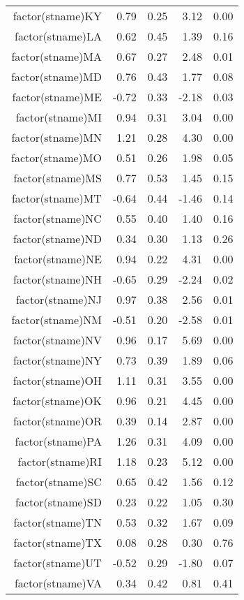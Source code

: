 \begin{table}[ht]
\begin{tabular}{rrrrr}
  factor(stname)KY & 0.79 & 0.25 & 3.12 & 0.00 \\ 
  factor(stname)LA & 0.62 & 0.45 & 1.39 & 0.16 \\ 
  factor(stname)MA & 0.67 & 0.27 & 2.48 & 0.01 \\ 
  factor(stname)MD & 0.76 & 0.43 & 1.77 & 0.08 \\ 
  factor(stname)ME & -0.72 & 0.33 & -2.18 & 0.03 \\ 
  factor(stname)MI & 0.94 & 0.31 & 3.04 & 0.00 \\ 
  factor(stname)MN & 1.21 & 0.28 & 4.30 & 0.00 \\ 
  factor(stname)MO & 0.51 & 0.26 & 1.98 & 0.05 \\ 
  factor(stname)MS & 0.77 & 0.53 & 1.45 & 0.15 \\ 
  factor(stname)MT & -0.64 & 0.44 & -1.46 & 0.14 \\ 
  factor(stname)NC & 0.55 & 0.40 & 1.40 & 0.16 \\ 
  factor(stname)ND & 0.34 & 0.30 & 1.13 & 0.26 \\ 
  factor(stname)NE & 0.94 & 0.22 & 4.31 & 0.00 \\ 
  factor(stname)NH & -0.65 & 0.29 & -2.24 & 0.02 \\ 
  factor(stname)NJ & 0.97 & 0.38 & 2.56 & 0.01 \\ 
  factor(stname)NM & -0.51 & 0.20 & -2.58 & 0.01 \\ 
  factor(stname)NV & 0.96 & 0.17 & 5.69 & 0.00 \\ 
  factor(stname)NY & 0.73 & 0.39 & 1.89 & 0.06 \\ 
  factor(stname)OH & 1.11 & 0.31 & 3.55 & 0.00 \\ 
  factor(stname)OK & 0.96 & 0.21 & 4.45 & 0.00 \\ 
  factor(stname)OR & 0.39 & 0.14 & 2.87 & 0.00 \\ 
  factor(stname)PA & 1.26 & 0.31 & 4.09 & 0.00 \\ 
  factor(stname)RI & 1.18 & 0.23 & 5.12 & 0.00 \\ 
  factor(stname)SC & 0.65 & 0.42 & 1.56 & 0.12 \\ 
  factor(stname)SD & 0.23 & 0.22 & 1.05 & 0.30 \\ 
  factor(stname)TN & 0.53 & 0.32 & 1.67 & 0.09 \\ 
  factor(stname)TX & 0.08 & 0.28 & 0.30 & 0.76 \\ 
  factor(stname)UT & -0.52 & 0.29 & -1.80 & 0.07 \\ 
  factor(stname)VA & 0.34 & 0.42 & 0.81 & 0.41 \\ 

\end{tabular}
\end{table}
